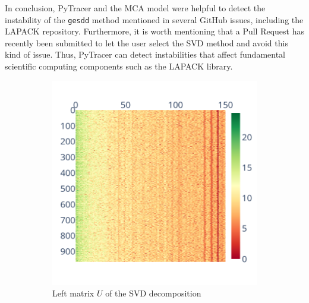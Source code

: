 \documentclass[11pt]{article}
\newcommand{\tristan}[1]{\color{orange}\textbf{From Tristan:} #1\color{black}\xspace}
\newcommand{\pytracer}[0]{PyTracer\xspace}
\begin{document}
In conclusion, \pytracer and the MCA model were helpful to detect the instability of the \texttt{gesdd} method mentioned in several GitHub issues, including the LAPACK repository. Furthermore, it is worth mentioning that a Pull Request has recently been submitted to let the user select the SVD method and avoid this kind of issue. Thus, \pytracer can detect instabilities that affect fundamental scientific computing components such as the LAPACK library.



\begin{figure}
    \centering
    \begin{subfigure}{0.3\linewidth}
    \includegraphics[width=\linewidth]{figure/face_recognition/randomized_svd_ret_U_sig_zoom.png}
    \caption{Left matrix $U$ of the SVD decomposition}
    \label{fig:randomized_svd_U}
    \end{subfigure}
    \begin{subfigure}{0.3\linewidth}

\end{subfigure}
\end{figure}
\end{document}
